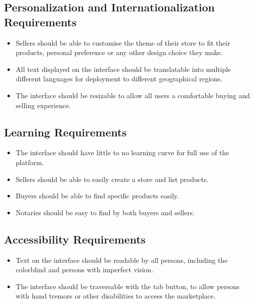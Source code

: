 \documentclass{article}
\begin{document}
\subsection{Personalization and Internationalization Requirements}
\begin{itemize}
\item
Sellers should be able to customise the theme of their store to fit their products, personal preference or any other design choice they make. 

\item
All text displayed on the interface should be translatable into multiple different languages for deployment to different geographical regions.

\item
The interface should be resizable to allow all users a comfortable buying and selling experience.
\end{itemize}

\subsection{Learning Requirements}
\begin{itemize}
\item
The interface should have little to no learning curve for full use of the platform.

\item
Sellers should be able to easily create a store and list products.

\item
Buyers should be able to find specific products easily.

\item
Notaries should be easy to find by both buyers and sellers.
\end{itemize}


\subsection{Accessibility Requirements}
\begin{itemize}
\item
Text on the interface should be readable by all persons, including the colorblind and persons with imperfect vision.

\item
The interface should be traversable with the tab button, to allow persons with hand tremors or other disabilities to access the marketplace.


\end{itemize}
\end{document}
